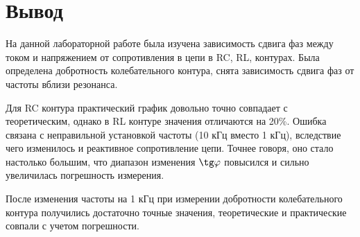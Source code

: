 \documentclass{physlab}
\begin{document}
\section{Вывод}

На данной лабораторной работе была изучена зависимость сдвига фаз между током и напряжением от сопротивления в цепи в RC, RL, контурах. Была определена добротность колебательного контура, снята зависимость сдвига фаз от частоты вблизи резонанса. 

Для RC контура практический график довольно точно совпадает с теоретическим, однако в RL контуре значения отличаются на 20\%. Ошибка связана с неправильной установкой частоты (10 кГц вместо 1 кГц), вследствие чего изменилось и реактивное сопротивление цепи. Точнее говоря, оно стало настолько большим, что диапазон изменения $\tg \varphi$ повысился и сильно увеличилась погрешность измерения.

После изменения частоты на 1 кГц при измерении добротности колебательного контура получились достаточно точные значения, теоретические и практические совпали с учетом погрешности.
\end{document}
